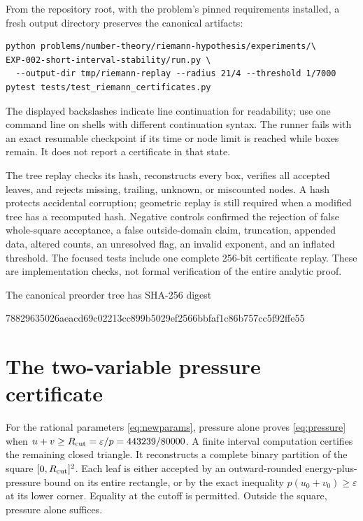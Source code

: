 ﻿\documentclass[11pt]{article}
\theoremstyle{remark}
\begin{document}
\begin{samepage}
From the repository root, with the problem's pinned requirements installed,
a fresh output directory preserves the canonical artifacts:
\begin{verbatim}
python problems/number-theory/riemann-hypothesis/experiments/\
EXP-002-short-interval-stability/run.py \
  --output-dir tmp/riemann-replay --radius 21/4 --threshold 1/7000
pytest tests/test_riemann_certificates.py
\end{verbatim}
\end{samepage}
The displayed backslashes indicate line continuation for readability;
use one command line on shells with different continuation syntax.
The runner fails with an exact resumable checkpoint if its time or node
limit is reached while boxes remain. It does not report a certificate in
that state.

The tree replay checks its hash, reconstructs every box, verifies all
accepted leaves, and rejects missing, trailing, unknown, or miscounted
nodes. A hash protects accidental corruption; geometric replay is still
required when a modified tree has a recomputed hash. Negative controls
confirmed the rejection of false whole-square acceptance, a false
outside-domain claim, truncation, appended data, altered counts, an
unresolved flag, an invalid exponent, and an inflated threshold. The
focused tests include one complete 256-bit certificate replay. These are
implementation checks, not formal verification of the entire analytic
proof.

The canonical preorder tree has SHA-256 digest
\begin{center}\small\ttfamily
78829635026aeacd69c02213cc899b5029ef2566bbfaf1c86b757cc5f92ffe55
\end{center}

\section{The two-variable pressure certificate}\label{sec:pressurecert}

For the rational parameters \eqref{eq:newparams}, pressure alone proves
\eqref{eq:pressure} when $u+v\ge R_{\rm cut}=\varepsilon/p=443239/80000$.
A finite interval computation certifies the remaining closed triangle. It
reconstructs a complete binary partition of the square
$[0,R_{\rm cut}]^2$. Each leaf is either accepted by an outward-rounded
energy-plus-pressure bound on its entire rectangle, or by the exact
inequality $p(u_0+v_0)\ge\varepsilon$ at its lower corner. Equality at
the cutoff is permitted. Outside the square, pressure alone suffices.
\end{document}
